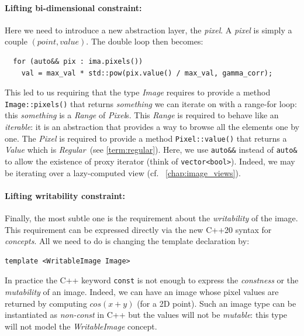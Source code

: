 \paragraph{Lifting bi-dimensional constraint:}
Here we need to introduce a new abstraction layer, the \emph{pixel}. A \emph{pixel} is simply a couple \((point,
value)\). The double loop then becomes:

\begin{verbatim}
  for (auto&& pix : ima.pixels())
    val = max_val * std::pow(pix.value() / max_val, gamma_corr);
\end{verbatim}

\noindent This led to us requiring that the type \emph{Image} requires to provide a method \texttt{Image::pixels()} that
returns \emph{something} we can iterate on with a range-for loop: this \emph{something} is a \emph{Range} of
\emph{Pixel}s. This \emph{Range} is required to behave like an \emph{iterable}: it is an abstraction that provides a way
to browse all the elements one by one. The \emph{Pixel} is required to provide a method \texttt{Pixel::value()} that
returns a \emph{Value} which is \emph{Regular}~(see \cref{term:regular}). Here, we use \texttt{auto\&\&} instead of
\texttt{auto\&} to allow the existence of proxy iterator (think of \texttt{vector<bool>}). Indeed, we may be iterating
over a lazy-computed view (cf. ~\cref{chap:image_views}).



\paragraph{Lifting writability constraint:}
Finally, the most subtle one is the requirement about the \emph{writability} of the image. This requirement can be
expressed directly via the new C++20 syntax for \emph{concepts}. All we need to do is changing the template declaration
by:

\begin{verbatim}
template <WritableImage Image>
\end{verbatim}

\noindent In practice the C++ keyword \texttt{const} is not enough to express the \emph{constness} or the
\emph{mutability} of an image. Indeed, we can have an image whose pixel values are returned by computing \(cos(x+y)\)
(for a 2D point). Such an image type can be instantiated as \emph{non-const} in C++ but the values will not be
\emph{mutable}: this type will not model the \emph{WritableImage} concept.



